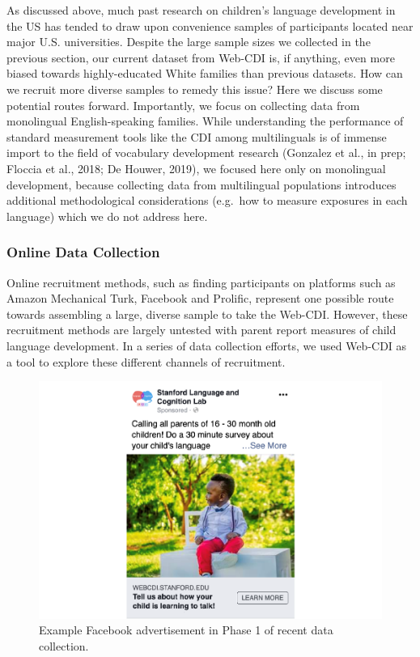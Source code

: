 \documentclass[
  english,
  man]{apa7}
\begin{document}
As discussed above, much past research on children's language development in the US has tended to draw upon convenience samples of participants located near major U.S. universities. Despite the large sample sizes we collected in the previous section, our current dataset from Web-CDI is, if anything, even more biased towards highly-educated White families than previous datasets. How can we recruit more diverse samples to remedy this issue? Here we discuss some potential routes forward. Importantly, we focus on collecting data from monolingual English-speaking families. While understanding the performance of standard measurement tools like the CDI among multilinguals is of immense import to the field of vocabulary development research (Gonzalez et al., in prep; Floccia et al., 2018; De Houwer, 2019), we focused here only on monolingual development, because collecting data from multilingual populations introduces additional methodological considerations (e.g.~how to measure exposures in each language) which we do not address here.

\hypertarget{online-data-collection}{%
\subsubsection{Online Data Collection}\label{online-data-collection}}

Online recruitment methods, such as finding participants on platforms such as Amazon Mechanical Turk, Facebook and Prolific, represent one possible route towards assembling a large, diverse sample to take the Web-CDI. However, these recruitment methods are largely untested with parent report measures of child language development. In a series of data collection efforts, we used Web-CDI as a tool to explore these different channels of recruitment.

\begin{figure}
\centering
\includegraphics{webcdi_paper_files/figure-latex/facebookad-1.pdf}
\caption{\label{fig:facebookad}Example Facebook advertisement in Phase 1 of recent data collection.}
\end{figure}
\end{document}
